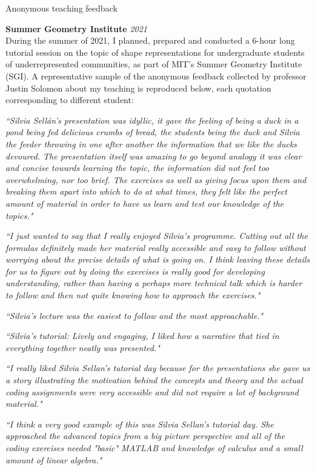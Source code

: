 \documentclass{resume}
\newcommand{\cvitem}[3]{
    {\bf #1} \hfill {\em \small #2} \\ 
    {\small#3 }
}
\newcommand{\feedback}[1]{\it \small #1}
\begin{document}
\begin{rSection}{Anonymous teaching feedback}

\cvitem{Summer Geometry Institute}{2021}{During the summer of 2021, I planned, prepared and conducted a 6-hour long tutorial session on the topic of shape representations for undergraduate students of underrepresented communities, as part of MIT's Summer Geometry Institute (SGI). A representative sample of the anonymous feedback collected by professor Justin Solomon about my teaching is reproduced below, each quotation corresponding to different student:}

\feedback{``Silvia Sellán's presentation was idyllic, it gave the feeling of being a duck in a pond being fed delicious crumbs of bread, the students being the duck and Silvia the feeder throwing in one after another the information that we like the ducks devoured. The presentation itself was amazing to go beyond analogy it was clear and concise towards learning the topic, the information did not feel too overwhelming, nor too brief.  The exercises as well as giving focus upon them and breaking them apart into which to do at what times, they felt like the perfect amount of material in order to have us learn and test our knowledge of the topics."}

\feedback{``I just wanted to say that I really enjoyed Silvia's programme. Cutting out all the formulas definitely made her material really accessible and easy to follow without worrying about the precise details of what is going on. I think leaving these details for us to figure out by doing the exercises is really good for developing understanding, rather than having a perhaps more technical talk which is harder to follow and then not quite knowing how to approach the exercises."}

\feedback{``Silvia's lecture was the easiest to follow and the most approachable."}

\feedback{``Silvia's tutorial: Lively and engaging, I liked how a narrative that tied in everything together neatly was presented."}

\feedback{``I really liked Silvia Sellan's tutorial day because for the presentations she gave us a story illustrating the motivation behind the concepts and theory and the actual coding assignments were very accessible and did not require a lot of background material."}

\feedback{``I think a very good example of this was Silvia Sellan's tutorial day. She approached the advanced topics from a big picture perspective and all of the coding exercises needed "basic" MATLAB and knowledge of calculus and a small amount of linear algebra."}


\end{rSection}
\end{document}
